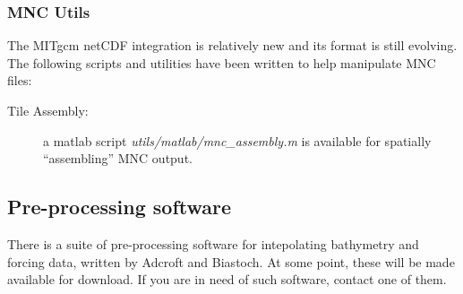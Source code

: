\subsubsection{MNC Utils}

The MITgcm netCDF integration is relatively new and its format is
still evolving.  The following scripts and utilities have been written
to help manipulate MNC files:
\begin{description}
\item[Tile Assembly:] a matlab script {\em
    utils/matlab/mnc\_assembly.m} is available for spatially
  ``assembling'' MNC output.

\end{description}


\subsection{Pre-processing software}

There is a suite of pre-processing software for intepolating
bathymetry and forcing data, written by Adcroft and Biastoch. At some
point, these will be made available for download. If you are in need
of such software, contact one of them.

